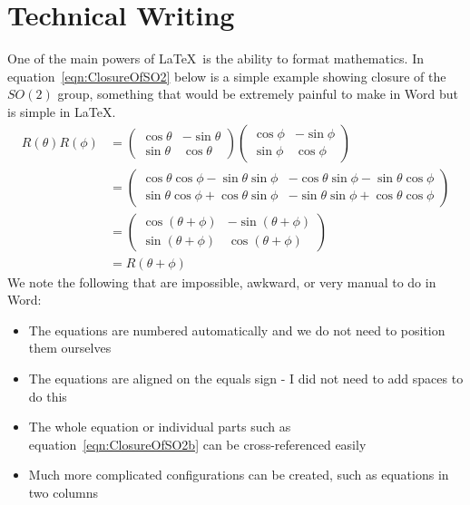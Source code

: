 \section{Technical Writing}
\label{sec:TechnicalWriting}

One of the main powers of \LaTeX\ is the ability to format mathematics. In equation~\eqref{eqn:ClosureOfSO2} below is a simple example showing closure of the $SO(2)$ group, something that would be extremely painful to make in Word but is simple in \LaTeX.
\begin{subequations}
\begin{align}
	R(\theta)R(\phi) &= 
	\left( \begin{array}{cc}
		\cos\theta & -\sin\theta \\
		\sin\theta & \cos\theta
	\end{array} \right)
	\left( \begin{array}{cc}
		\cos\phi & -\sin\phi \\
		\sin\phi & \cos\phi
	\end{array} \right)\label{eqn:ClosureOfSO2a}  \\
	&= \left( \begin{array}{cc}
		\cos\theta\cos\phi - \sin\theta\sin\phi & -\cos\theta\sin\phi -\sin\theta\cos\phi \\
		\sin\theta\cos\phi + \cos\theta\sin\phi & -\sin\theta\sin\phi + \cos\theta\cos\phi
	\end{array} \right)\label{eqn:ClosureOfSO2b}  \\
	&= \left( \begin{array}{cc}
		\cos(\theta + \phi) & -\sin(\theta + \phi) \\
		\sin(\theta + \phi) & \cos(\theta + \phi)
	\end{array} \right)\label{eqn:ClosureOfSO2c}  \\
	&= R(\theta + \phi)\label{eqn:ClosureOfSO2d}
\end{align}
\label{eqn:ClosureOfSO2}
\end{subequations}
We note the following that are impossible, awkward, or very manual to do in Word:

\begin{itemize}
	\item The equations are numbered automatically and we do not need to position them ourselves
	\item The equations are aligned on the equals sign - I did not need to add spaces to do this
	\item The whole equation or individual parts such as equation~\eqref{eqn:ClosureOfSO2b} can be cross-referenced easily
	\item Much more complicated configurations can be created, such as equations in two columns
\end{itemize}

